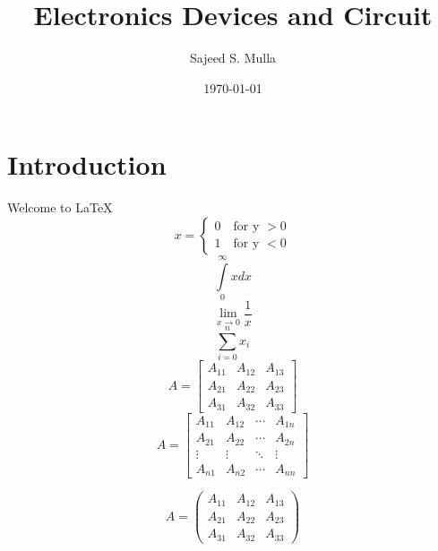 \documentclass[12pt,a4paper,twoside]{report}
\title{Electronics Devices and Circuit}
\author{Sajeed S. Mulla}
\date{\today}
\begin{document}
\maketitle
\tableofcontents
\pagestyle{fancy}
\fancyhf{}
\fancyfoot[RO, LE]{\thepage}
\chapter{Introduction}
Welcome to \LaTeX
\lipsum
\lipsum[2]
\begin{equation}
x = 
\begin{cases}
 0 \quad \text{for y } > 0 \\
 1 \quad \text{for y } < 0
\end{cases}
\end{equation}
\begin{equation}
\int \limits_0^\infty x dx 
\end{equation}
\begin{equation}
\lim_{x \to 0} \frac{1}{x}
\end{equation}
\begin{equation}
\sum \limits_{i=0}^{n} x_i
\end{equation}
\begin{equation}
A =
\begin{bmatrix}
A_{11} & A_{12} & A_{13} \\
A_{21} & A_{22} & A_{23} \\
A_{31} & A_{32} & A_{33}
\end{bmatrix}
\end{equation}
\begin{equation}
A =
\begin{bmatrix}
A_{11} & A_{12} & \cdots &A_{1n} \\
A_{21} & A_{22} & \cdots &A_{2n} \\
\vdots & \vdots & \ddots & \vdots \\
A_{n1} & A_{n2} & \cdots &A_{nn}
\end{bmatrix}
\end{equation}

\begin{equation}
A =
\begin{pmatrix}
A_{11} & A_{12} & A_{13} \\
A_{21} & A_{22} & A_{23} \\
A_{31} & A_{32} & A_{33}
\end{pmatrix}
\end{equation}
\end{document}
